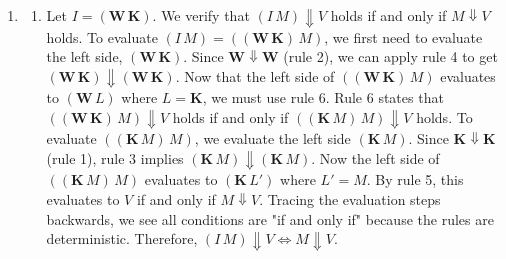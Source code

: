 \documentclass{article}
\begin{document}
\begin{enumerate}[label=\fbox{\arabic*}]
\begin{enumerate}[label=(\arabic*)]
          Then $2y^2 = (x^2+y^2) - (x^2-y^2) = \frac{1}{\sqrt{1+\beta^2}} - \frac{1}{1+\beta^2}$.
          Thus, $f(\beta) = 2y = \sqrt{2 \left( \frac{1}{\sqrt{1+\beta^2}} - \frac{1}{1+\beta^2} \right)}$.
          \item Let $z = \frac{1}{\sqrt{1+\beta^2}}$. As $\beta$ ranges from $0$ to $\infty$, $z$ ranges from $1$ to $0$.
          We have $f(\beta) = \sqrt{2(z - z^2)}$.
          The maximum of the quadratic $z - z^2$ on $(0, 1)$ occurs at $z = 1/2$, where its value is $1/4$.
          The corresponding value of $\beta$ is found from $\frac{1}{\sqrt{1+\beta^2}} = \frac{1}{2}$, which gives $1+\beta^2 = 4 \implies \beta = \sqrt{3}$.
          At this maximum, $f(\sqrt{3}) = \sqrt{2(1/4)} = \frac{1}{\sqrt{2}}$.
          Behavior of $f(\beta)$: 
          As $\beta \to 0$, $z \to 1$, so $f(\beta) \to 0$. As $\beta \to \infty$, $z \to 0$, so $f(\beta) \to 0$.
          $f(\beta)$ starts at 0, increases monotonically to its maximum value $\frac{1}{\sqrt{2}}$ at $\beta = \sqrt{3}$, and then decreases asymptotically towards 0 as $\beta \to \infty$.
        \end{enumerate}

  \item %
        \begin{enumerate}[label=(\arabic*)]
          \item Let $I = ( \mathbf{W} \, \mathbf{K} ) $. 
          We verify that $(I \, M) \Downarrow V$ holds if and only if $M \Downarrow V$ holds. 
          To evaluate $(I \, M) = ((\mathbf{W} \, \mathbf{K}) \, M)$, we first need to evaluate the left side, $(\mathbf{W} \, \mathbf{K})$. 
          Since $\mathbf{W} \Downarrow \mathbf{W}$ (rule 2), we can apply rule 4 to get $(\mathbf{W} \, \mathbf{K}) \Downarrow (\mathbf{W} \, \mathbf{K})$.
          Now that the left side of $((\mathbf{W} \, \mathbf{K}) \, M)$ evaluates to $(\mathbf{W} \, L)$ where $L = \mathbf{K}$, we must use rule 6. Rule 6 states that $((\mathbf{W} \, \mathbf{K}) \, M) \Downarrow V$ holds if and only if $((\mathbf{K} \, M) \, M) \Downarrow V$ holds.
          To evaluate $((\mathbf{K} \, M) \, M)$, we evaluate the left side $(\mathbf{K} \, M)$. Since $\mathbf{K} \Downarrow \mathbf{K}$ (rule 1), rule 3 implies $(\mathbf{K} \, M) \Downarrow (\mathbf{K} \, M)$.
          Now the left side of $((\mathbf{K} \, M) \, M)$ evaluates to $(\mathbf{K} \, L')$ where $L' = M$. By rule 5, this evaluates to $V$ if and only if $M \Downarrow V$.
          Tracing the evaluation steps backwards, we see all conditions are "if and only if" because the rules are deterministic. Therefore, $(I \, M) \Downarrow V \iff M \Downarrow V$.
          

\end{enumerate}
\end{enumerate}
\end{document}
